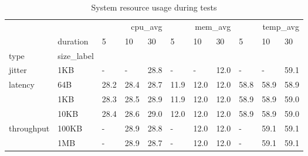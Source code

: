 \begin{table}[htbp]
\caption{System resource usage during tests}
\label{tab:resource_usage}
\begin{tabular}{lllllllllll}
\toprule
 &  & \multicolumn{3}{r}{cpu_avg} & \multicolumn{3}{r}{mem_avg} & \multicolumn{3}{r}{temp_avg} \\
 & duration & 5 & 10 & 30 & 5 & 10 & 30 & 5 & 10 & 30 \\
type & size_label &  &  &  &  &  &  &  &  &  \\
\midrule
jitter & 1KB & - & - & 28.8 & - & - & 12.0 & - & - & 59.1 \\
\cline{1-11}
\multirow[t]{3}{*}{latency} & 64B & 28.2 & 28.4 & 28.7 & 11.9 & 12.0 & 12.0 & 58.8 & 58.9 & 58.9 \\
 & 1KB & 28.3 & 28.5 & 28.9 & 11.9 & 12.0 & 12.0 & 58.9 & 58.9 & 59.0 \\
 & 10KB & 28.4 & 28.6 & 29.0 & 12.0 & 12.0 & 12.0 & 58.9 & 58.9 & 59.0 \\
\cline{1-11}
\multirow[t]{2}{*}{throughput} & 100KB & - & 28.9 & 28.8 & - & 12.0 & 12.0 & - & 59.1 & 59.1 \\
 & 1MB & - & 28.9 & 28.7 & - & 12.0 & 12.0 & - & 59.1 & 59.1 \\
\cline{1-11}
\bottomrule
\end{tabular}
\end{table}
